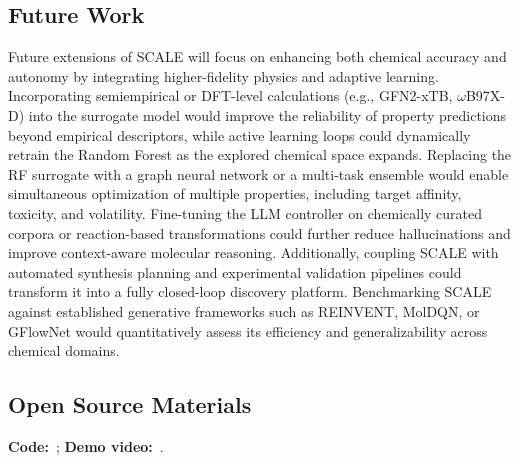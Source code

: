 \subsection*{Future Work}
Future extensions of SCALE will focus on enhancing both chemical accuracy and autonomy by integrating higher-fidelity physics and adaptive learning. Incorporating semiempirical or DFT-level calculations (e.g., GFN2-xTB, $\omega$B97X-D) into the surrogate model would improve the reliability of property predictions beyond empirical descriptors, while active learning loops could dynamically retrain the Random Forest as the explored chemical space expands. Replacing the RF surrogate with a graph neural network or a multi-task ensemble would enable simultaneous optimization of multiple properties, including target affinity, toxicity, and volatility. Fine-tuning the LLM controller on chemically curated corpora or reaction-based transformations could further reduce hallucinations and improve context-aware molecular reasoning. Additionally, coupling SCALE with automated synthesis planning and experimental validation pipelines could transform it into a fully closed-loop discovery platform. Benchmarking SCALE against established generative frameworks such as REINVENT, MolDQN, or GFlowNet would quantitatively assess its efficiency and generalizability across chemical domains.

\subsection*{Open Source Materials}
\textbf{Code:} \,; \textbf{Demo video:} \,.







